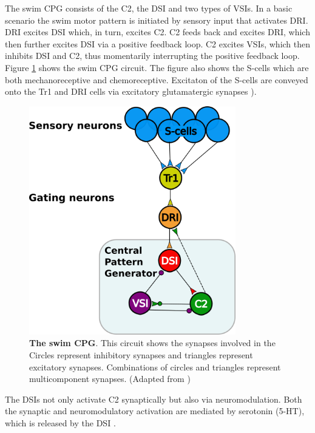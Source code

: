 The swim \ac{CPG} consists of the \ac{C2}, the \ac{DSI} and two types of \acp{VSI}. In a basic scenario the swim motor pattern is initiated by sensory input that activates \ac{DRI}. \ac{DRI} excites \ac{DSI} which, in turn, excites \ac{C2}. \ac{C2} feeds back and excites \ac{DRI}, which then further excites \ac{DSI} via a positive feedback loop. \ac{C2} excites \acp{VSI}, which then inhibits \ac{DSI} and \ac{C2}, thus momentarily interrupting the positive feedback loop. Figure \ref{fig:Tritonia_swim_CPGcircuit} shows the  swim \ac{CPG} circuit. The figure also shows the S-cells which are both mechanoreceptive and chemoreceptive. Excitaton of the S-cells are conveyed onto the Tr1 and \ac{DRI} cells via excitatory glutamatergic synapses \cite{Frost1996, Katz2009}).

\begin{figure}[H]
	\centering
	\includegraphics[width=9cm]{graphics/Tritonia_swim_CPGcircuit.png}
	\caption[The  swim \ac{CPG}.]{\textbf{The  swim \ac{CPG}}. This circuit shows the synapses involved in the  Circles represent inhibitory synapses and triangles represent excitatory synapses. Combinations of circles and triangles represent multicomponent synapses. (Adapted from \cite{Katz2009})}
	\label{fig:Tritonia_swim_CPGcircuit}
\end{figure}

The \acp{DSI} not only activate \ac{C2} synaptically but also via neuromodulation. Both the synaptic and neuromodulatory activation are mediated by serotonin (5-HT), which is released by the \ac{DSI} \cite{Katz1995, Katz1997}.

